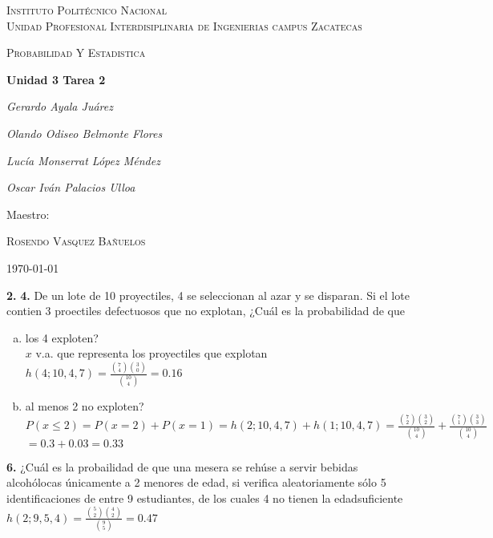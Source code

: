 \documentclass[12pt, letterpaper]{article}
\begin{document}
    \begin{titlepage}
        \centering
        {\scshape\LARGE Instituto Politécnico Nacional\\ Unidad Profesional Interdisiplinaria de Ingenierias campus Zacatecas\par}
        \vspace{1cm}
        {\scshape\Large Probabilidad Y Estadistica\par}
        \vspace{1.5cm}
        {\huge\bfseries Unidad 3 Tarea 2\par}
        \vspace{2cm}
        {\Large\itshape Gerardo Ayala Juárez\par}
        {\Large\itshape Olando Odiseo Belmonte Flores\par}
        {\Large\itshape Lucía Monserrat López Méndez\par}
        {\Large\itshape Oscar Iván Palacios Ulloa\par}
        \vfill
        Maestro:\par
        \textsc{
        Rosendo Vasquez Bañuelos}
        \vfill
        {\large \today \par}
    \end{titlepage}

    \textbf{2. }\vskip1cm
    \textbf{4. }De un lote de 10 proyectiles, 4 se seleccionan al azar y se disparan. Si el lote contien 3 proectiles
    defectuosos que no explotan, ¿Cuál es la probabilidad de que
    \begin{enumerate}[a)]
        \item los 4 exploten?\\
            $x$ v.a. que representa los proyectiles que explotan\vskip0.3cm
            $h(4;10,4,7)=\displaystyle\frac{\displaystyle\binom{7}{4}\displaystyle\binom{3}{0}
            }{\displaystyle\binom{10}{4}}=0.16$
        \item al menos 2 no exploten?\vskip0.3cm
            $P(x\leq 2)=P(x=2)+P(x=1)=h(2;10,4,7)+h(1;10,4,7)=\displaystyle\frac{\displaystyle\binom{7}{2}\displaystyle\binom{3}{2}}{\displaystyle\binom{10}{4}}+
            \displaystyle\frac{\displaystyle\binom{7}{1}\displaystyle\binom{3}{3}}{\displaystyle\binom{10}{4}}$\vskip0.3cm
            $=0.3+0.03=0.33$
    \end{enumerate}\vskip1cm

    \textbf{6. }¿Cuál es la probailidad de que una mesera se rehúse a servir bebidas alcohólocas únicamente a 2 menores
    de edad, si verifica aleatoriamente sólo 5 identificaciones de entre 9 estudiantes, de los cuales 4 no tienen la
    edadsuficiente\vskip0.3cm
            $h(2;9,5,4)=\displaystyle\frac{\displaystyle\binom{5}{2}\displaystyle\binom{4}{2}}{\displaystyle\binom{9}{5}}=0.47$
\end{document}

